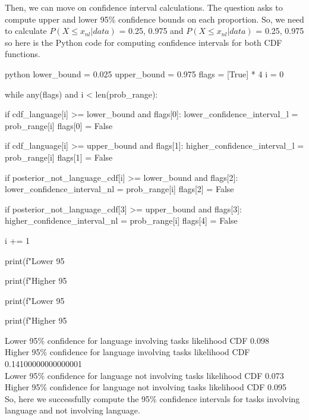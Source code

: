 \documentclass[12pt]{amsart}
\begin{document}
Then, we can move on confidence interval calculations. The question asks to compute upper and lower 95\% confidence bounds on each proportion. So, we need to calculate $P(X\leq x_{nl}|data)$ = 0.25, 0.975 and $P(X\leq x_{nl}|data)$ = 0.25, 0.975 so here is the Python code for computing confidence intervals for both CDF functions.
 \begin{mintedbox}{python}
lower_bound = 0.025
upper_bound = 0.975
flags = [True] * 4
i = 0

while any(flags) and i < len(prob_range):

    
    if cdf_language[i] >= lower_bound and flags[0]:
        lower_confidence_interval_l = prob_range[i]
        flags[0] = False
        

    if cdf_language[i] >= upper_bound and flags[1]:
        higher_confidence_interval_l = prob_range[i]
        flags[1] = False

    if posterior_not_language_cdf[i] >= lower_bound and flags[2]:
        lower_confidence_interval_nl = prob_range[i]
        flags[2] = False
        

    if posterior_not_language_cdf[3] >= upper_bound and flags[3]:
        higher_confidence_interval_nl = prob_range[i]
        flags[4] = False

    i += 1
        
        
print(f"Lower 95%

print(f"Higher 95%

print(f"Lower 95%

print(f"Higher 95%

\end{mintedbox}
Lower 95\% confidence for language involving tasks likelihood CDF 0.098 \\
Higher 95\%  confidence for language involving tasks likelihood CDF 0.14100000000000001 \\
Lower 95\% confidence for language not involving tasks likelihood CDF 0.073 \\
Higher 95\%  confidence for language not involving tasks likelihood CDF 0.095 \\

So, here we successfully compute the 95\% confidence intervals for tasks involving language and not involving language. 
\end{document}
